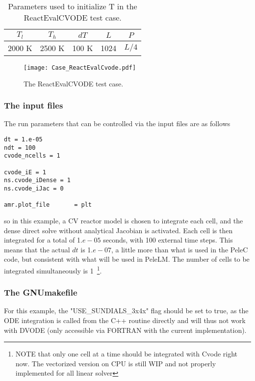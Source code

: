 \documentclass[12pt]{article}
\begin{document}
\begin{table}
\centering
\begin{tabular}{c c c c c}
\hline 
$T_l$                 & $T_h$            & $dT$              & $L$    & $P$           \\
\hline \hline
2000 K               & 2500 K           & 100 K            & 1024         &  $L/4$ \\
\end{tabular}
\caption{Parameters used to initialize T in the ReactEvalCVODE test case.}
\label{Tab::ParamReactEvalCvode}
\end{table}

\begin{figure*}
\centering
\texttt{[image: Case\_ReactEvalCvode.pdf]}
\caption{The ReactEvalCVODE test case.}
\label{Fig:ErrH2}
\end{figure*}

\subsubsection{The input files}
The run parameters that can be controlled via the input files are as follows
\begin{verbatim}
dt = 1.e-05  
ndt = 100
cvode_ncells = 1

cvode_iE = 1
ns.cvode_iDense = 1
ns.cvode_iJac = 0

amr.plot_file       = plt
\end{verbatim}
so in this example, a CV reactor model is chosen to integrate each cell, and the dense direct solve without analytical Jacobian is activated. Each cell is then integrated for a total of 1.$e-05$ seconds, with 100 external time steps. This means that the actual $dt$ is 1.$e-07$, a little more than what is used in the PeleC code, but consistent with what will be used in PeleLM. The number of cells to be integrated simultaneously is 1~\footnote{NOTE that only one cell at a time should be integrated with Cvode right now. The vectorized version on CPU is still WIP and not properly implemented for all linear solver}.

\subsubsection{The GNUmakefile}
For this example, the "USE_SUNDIALS_3x4x" flag should be set to true, as the ODE integration is called from the C++ routine directly and will thus not work with DVODE (only accessible via FORTRAN with the current implementation).
\end{document}

